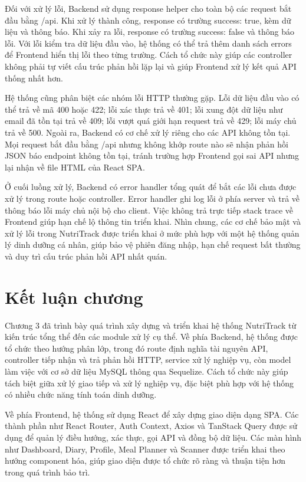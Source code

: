 \documentclass[12pt, a4paper]{report}
\begin{document}
Đối với xử lý lỗi, Backend sử dụng response helper cho toàn bộ các request bắt đầu bằng /api. Khi xử lý thành công, response có trường success: true, kèm dữ liệu và thông báo. Khi xảy ra lỗi, response có trường success: false và thông báo lỗi. Với lỗi kiểm tra dữ liệu đầu vào, hệ thống có thể trả thêm danh sách errors để Frontend hiển thị lỗi theo từng trường. Cách tổ chức này giúp các controller không phải tự viết cấu trúc phản hồi lặp lại và giúp Frontend xử lý kết quả API thống nhất hơn.

Hệ thống cũng phân biệt các nhóm lỗi HTTP thường gặp. Lỗi dữ liệu đầu vào có thể trả về mã 400 hoặc 422; lỗi xác thực trả về 401; lỗi xung đột dữ liệu như email đã tồn tại trả về 409; lỗi vượt quá giới hạn request trả về 429; lỗi máy chủ trả về 500. Ngoài ra, Backend có cơ chế xử lý riêng cho các API không tồn tại. Mọi request bắt đầu bằng /api nhưng không khớp route nào sẽ nhận phản hồi JSON báo endpoint không tồn tại, tránh trường hợp Frontend gọi sai API nhưng lại nhận về file HTML của React SPA.

Ở cuối luồng xử lý, Backend có error handler tổng quát để bắt các lỗi chưa được xử lý trong route hoặc controller. Error handler ghi log lỗi ở phía server và trả về thông báo lỗi máy chủ nội bộ cho client. Việc không trả trực tiếp stack trace về Frontend giúp hạn chế lộ thông tin triển khai. Nhìn chung, các cơ chế bảo mật và xử lý lỗi trong NutriTrack được triển khai ở mức phù hợp với một hệ thống quản lý dinh dưỡng cá nhân, giúp bảo vệ phiên đăng nhập, hạn chế request bất thường và duy trì cấu trúc phản hồi API nhất quán.

\section{Kết luận chương}Chương 3 đã trình bày quá trình xây dựng và triển khai hệ thống NutriTrack từ kiến trúc tổng thể đến các module xử lý cụ thể. Về phía Backend, hệ thống được tổ chức theo hướng phân lớp, trong đó route định nghĩa tài nguyên API, controller tiếp nhận và trả phản hồi HTTP, service xử lý nghiệp vụ, còn model làm việc với cơ sở dữ liệu MySQL thông qua Sequelize. Cách tổ chức này giúp tách biệt giữa xử lý giao tiếp và xử lý nghiệp vụ, đặc biệt phù hợp với hệ thống có nhiều chức năng tính toán dinh dưỡng.

Về phía Frontend, hệ thống sử dụng React để xây dựng giao diện dạng SPA. Các thành phần như React Router, Auth Context, Axios và TanStack Query được sử dụng để quản lý điều hướng, xác thực, gọi API và đồng bộ dữ liệu. Các màn hình như Dashboard, Diary, Profile, Meal Planner và Scanner được triển khai theo hướng component hóa, giúp giao diện được tổ chức rõ ràng và thuận tiện hơn trong quá trình bảo trì.
\end{document}
